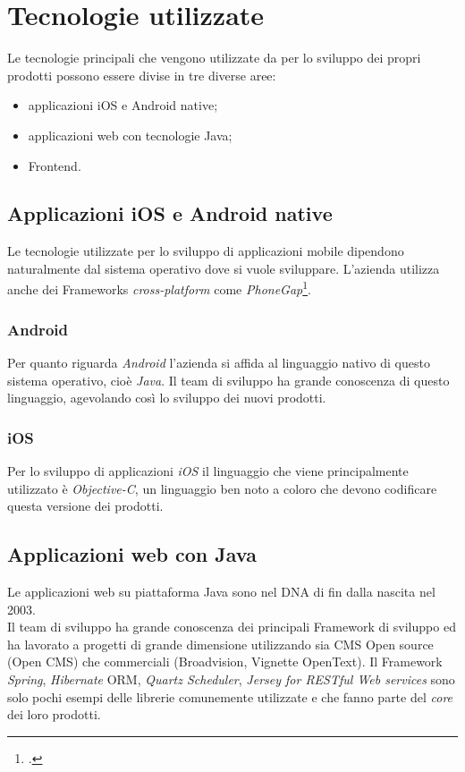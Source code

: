 \section{Tecnologie utilizzate}
Le tecnologie principali che vengono utilizzate da \azienda{} per lo sviluppo dei propri prodotti possono essere divise in tre diverse aree:
\begin{itemize}
	\item applicazioni iOS e Android native;
	\item applicazioni web con tecnologie Java;
	\item \gls{Frontend}.
\end{itemize} 

\subsection{Applicazioni iOS e Android native}
Le tecnologie utilizzate per lo sviluppo di applicazioni mobile dipendono naturalmente dal sistema operativo dove si vuole sviluppare. L'azienda utilizza anche dei \glspl{Framework} \emph{cross-platform} come \emph{PhoneGap}\footcite{phonegap}.
\subsubsection{Android}
Per quanto riguarda \emph{Android} l'azienda si affida al linguaggio nativo di questo sistema operativo, cioè \emph{Java}. 
Il team di sviluppo ha grande conoscenza di questo linguaggio, agevolando così lo sviluppo dei nuovi prodotti.
\subsubsection{iOS}
Per lo sviluppo di applicazioni \emph{iOS} il linguaggio che viene principalmente utilizzato è \emph{Objective-C}, un linguaggio ben noto a coloro che devono codificare questa versione dei prodotti.

\subsection{Applicazioni web con Java}
Le applicazioni web su piattaforma Java sono nel DNA di \azienda{} fin dalla nascita nel 2003. \\
Il team di sviluppo ha grande conoscenza dei principali \gls{Framework} di sviluppo ed ha lavorato a progetti di grande dimensione utilizzando sia \gls{CMS} \gls{Open source} (Open CMS) che commerciali (Broadvision, Vignette OpenText).
Il \gls{Framework} \emph{Spring}, \emph{Hibernate} \gls{ORM}, \emph{Quartz Scheduler}, \emph{Jersey for RESTful Web services} sono solo pochi esempi delle librerie comunemente utilizzate e che fanno parte del \emph{core} dei loro prodotti.

